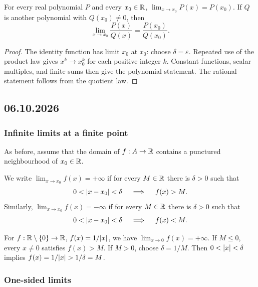\documentclass[11pt,a4paper]{amsart}
\begin{document}
\begin{corollary}
  For every real polynomial \(P\) and every \(x_0\in\mathbb{R}\),
  \(\lim_{x\to x_0}P(x)=P(x_0)\). If \(Q\) is another polynomial
  with \(Q(x_0)\neq0\), then
  \[
    \lim_{x\to x_0}\frac{P(x)}{Q(x)}=\frac{P(x_0)}{Q(x_0)}.
  \]
\end{corollary}

\begin{proof}
  The identity function has limit \(x_0\) at \(x_0\): choose
  \(\delta=\varepsilon\). Repeated use of the product law gives
  \(x^k\to x_0^k\) for each positive integer \(k\). Constant
  functions, scalar multiples, and finite sums then give the polynomial
  statement. The rational statement follows from the quotient law.
\end{proof}

\subsection{06.10.2026}

\subsubsection{Infinite limits at a finite point}

As before, assume that the domain of \(f:A\to\mathbb{R}\) contains a punctured
neighbourhood of \(x_0\in\mathbb{R}\).

\begin{definition}
  We write \(\lim_{x\to x_0}f(x)=+\infty\) if for every \(M\in\mathbb{R}\)
  there is \(\delta>0\) such that
  \[
    0<\lvert x-x_0\rvert<\delta \quad\implies\quad f(x)>M.
  \]
  Similarly, \(\lim_{x\to x_0}f(x)=-\infty\) if for every
  \(M\in\mathbb{R}\) there is \(\delta>0\) such that
  \[
    0<\lvert x-x_0\rvert<\delta \quad\implies\quad f(x)<M.
  \]
\end{definition}

\begin{example}
  For \(f:\mathbb{R}\setminus\left\lbrace0\right\rbrace\to\mathbb{R}\), \(f(x)=1/\lvert x\rvert\),
  we have \(\lim_{x\to0}f(x)=+\infty\). If \(M\leq0\), every
  \(x\neq0\) satisfies \(f(x)>M\). If \(M>0\), choose
  \(\delta=1/M\). Then \(0<\lvert x\rvert<\delta\) implies
  \(f(x)=1/\lvert x\rvert>1/\delta=M\).
\end{example}

\subsubsection{One-sided limits}
\end{document}
